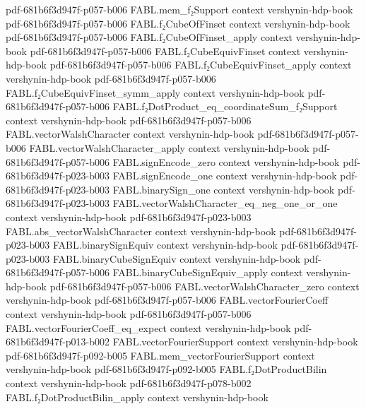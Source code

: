 \begin{theorem}
  {pdf-681b6f3d947f-p057-b006}
\proofstep
  {FABL.mem_f₂Support}
  {context}
  {vershynin-hdp-book}
  {pdf-681b6f3d947f-p057-b006}
\proofstep
  {FABL.f₂CubeOfFinset}
  {context}
  {vershynin-hdp-book}
  {pdf-681b6f3d947f-p057-b006}
\proofstep
  {FABL.f₂CubeOfFinset_apply}
  {context}
  {vershynin-hdp-book}
  {pdf-681b6f3d947f-p057-b006}
\proofstep
  {FABL.f₂CubeEquivFinset}
  {context}
  {vershynin-hdp-book}
  {pdf-681b6f3d947f-p057-b006}
\proofstep
  {FABL.f₂CubeEquivFinset_apply}
  {context}
  {vershynin-hdp-book}
  {pdf-681b6f3d947f-p057-b006}
\proofstep
  {FABL.f₂CubeEquivFinset_symm_apply}
  {context}
  {vershynin-hdp-book}
  {pdf-681b6f3d947f-p057-b006}
\proofstep
  {FABL.f₂DotProduct_eq_coordinateSum_f₂Support}
  {context}
  {vershynin-hdp-book}
  {pdf-681b6f3d947f-p057-b006}
\proofstep
  {FABL.vectorWalshCharacter}
  {context}
  {vershynin-hdp-book}
  {pdf-681b6f3d947f-p057-b006}
\proofstep
  {FABL.vectorWalshCharacter_apply}
  {context}
  {vershynin-hdp-book}
  {pdf-681b6f3d947f-p057-b006}
\proofstep
  {FABL.signEncode_zero}
  {context}
  {vershynin-hdp-book}
  {pdf-681b6f3d947f-p023-b003}
\proofstep
  {FABL.signEncode_one}
  {context}
  {vershynin-hdp-book}
  {pdf-681b6f3d947f-p023-b003}
\proofstep
  {FABL.binarySign_one}
  {context}
  {vershynin-hdp-book}
  {pdf-681b6f3d947f-p023-b003}
\proofstep
  {FABL.vectorWalshCharacter_eq_neg_one_or_one}
  {context}
  {vershynin-hdp-book}
  {pdf-681b6f3d947f-p023-b003}
\proofstep
  {FABL.abs_vectorWalshCharacter}
  {context}
  {vershynin-hdp-book}
  {pdf-681b6f3d947f-p023-b003}
\proofstep
  {FABL.binarySignEquiv}
  {context}
  {vershynin-hdp-book}
  {pdf-681b6f3d947f-p023-b003}
\proofstep
  {FABL.binaryCubeSignEquiv}
  {context}
  {vershynin-hdp-book}
  {pdf-681b6f3d947f-p057-b006}
\proofstep
  {FABL.binaryCubeSignEquiv_apply}
  {context}
  {vershynin-hdp-book}
  {pdf-681b6f3d947f-p057-b006}
\proofstep
  {FABL.vectorWalshCharacter_zero}
  {context}
  {vershynin-hdp-book}
  {pdf-681b6f3d947f-p057-b006}
\proofstep
  {FABL.vectorFourierCoeff}
  {context}
  {vershynin-hdp-book}
  {pdf-681b6f3d947f-p057-b006}
\proofstep
  {FABL.vectorFourierCoeff_eq_expect}
  {context}
  {vershynin-hdp-book}
  {pdf-681b6f3d947f-p013-b002}
\proofstep
  {FABL.vectorFourierSupport}
  {context}
  {vershynin-hdp-book}
  {pdf-681b6f3d947f-p092-b005}
\proofstep
  {FABL.mem_vectorFourierSupport}
  {context}
  {vershynin-hdp-book}
  {pdf-681b6f3d947f-p092-b005}
\proofstep
  {FABL.f₂DotProductBilin}
  {context}
  {vershynin-hdp-book}
  {pdf-681b6f3d947f-p078-b002}
\proofstep
  {FABL.f₂DotProductBilin_apply}
  {context}
  {vershynin-hdp-book}

\end{theorem}
